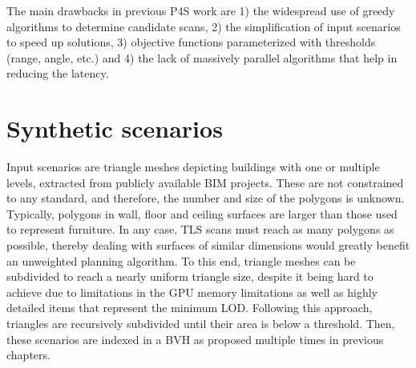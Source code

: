 The main drawbacks in previous P4S work are 1) the widespread use of greedy algorithms to determine candidate scans, 2) the simplification of input scenarios to speed up solutions, 3) objective functions parameterized with thresholds (range, angle, etc.) and 4) the lack of massively parallel algorithms that help in reducing the latency. 

\section{Synthetic scenarios}

Input scenarios are triangle meshes depicting buildings with one or multiple levels, extracted from publicly available BIM projects. These are not constrained to any standard, and therefore, the number and size of the polygons is unknown. Typically, polygons in wall, floor and ceiling surfaces are larger than those used to represent furniture. In any case, TLS scans must reach as many polygons as possible, thereby dealing with surfaces of similar dimensions would greatly benefit an unweighted planning algorithm. To this end, triangle meshes can be subdivided to reach a nearly uniform triangle size, despite it being hard to achieve due to limitations in the GPU memory limitations as well as highly detailed items that represent the minimum LOD. Following this approach, triangles are recursively subdivided until their area is below a threshold. Then, these scenarios are indexed in a BVH as proposed multiple times in previous chapters.

